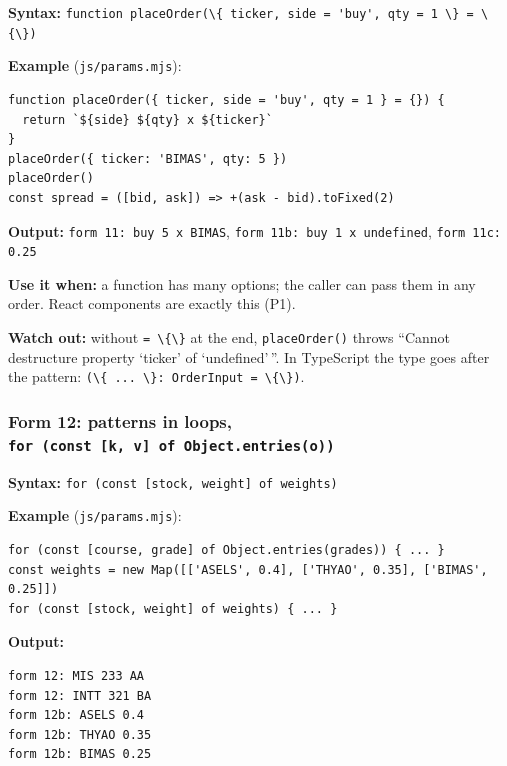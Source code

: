 \documentclass[
  11pt,
]{article}
\newcommand{\passthrough}[1]{#1}
\begin{document}
\textbf{Syntax:}
\passthrough{\lstinline!function placeOrder(\{ ticker, side = 'buy', qty = 1 \} = \{\})!}

\textbf{Example} (\passthrough{\lstinline!js/params.mjs!}):

\begin{lstlisting}
function placeOrder({ ticker, side = 'buy', qty = 1 } = {}) {
  return `${side} ${qty} x ${ticker}`
}
placeOrder({ ticker: 'BIMAS', qty: 5 })
placeOrder()
const spread = ([bid, ask]) => +(ask - bid).toFixed(2)
\end{lstlisting}

\textbf{Output:} \passthrough{\lstinline!form 11: buy 5 x BIMAS!},
\passthrough{\lstinline!form 11b: buy 1 x undefined!},
\passthrough{\lstinline!form 11c: 0.25!}

\textbf{Use it when:} a function has many options; the caller can pass
them in any order. React components are exactly this (P1).

\textbf{Watch out:} without \passthrough{\lstinline!= \{\}!} at the end,
\passthrough{\lstinline!placeOrder()!} throws ``Cannot destructure
property `ticker' of `undefined'\,''. In TypeScript the type goes after
the pattern: \passthrough{\lstinline!(\{ ... \}: OrderInput = \{\})!}.

\subsubsection{\texorpdfstring{Form 12: patterns in loops,
\texttt{for\ (const\ {[}k,\ v{]}\ of\ Object.entries(o))}}{Form 12: patterns in loops, for (const {[}k, v{]} of Object.entries(o))}}\label{form-12-patterns-in-loops-for-const-k-v-of-object.entrieso}

\textbf{Syntax:}
\passthrough{\lstinline!for (const [stock, weight] of weights)!}

\textbf{Example} (\passthrough{\lstinline!js/params.mjs!}):

\begin{lstlisting}
for (const [course, grade] of Object.entries(grades)) { ... }
const weights = new Map([['ASELS', 0.4], ['THYAO', 0.35], ['BIMAS', 0.25]])
for (const [stock, weight] of weights) { ... }
\end{lstlisting}

\textbf{Output:}

\begin{lstlisting}
form 12: MIS 233 AA
form 12: INTT 321 BA
form 12b: ASELS 0.4
form 12b: THYAO 0.35
form 12b: BIMAS 0.25
\end{lstlisting}
\end{document}
